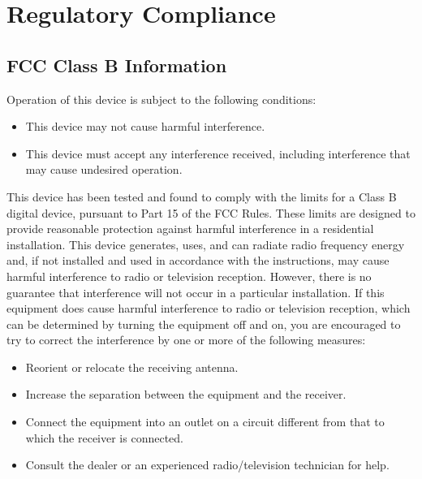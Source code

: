\documentclass[letterpaper,10pt,english]{sphinxmanual}
\begin{document}
\section{Regulatory Compliance}
\label{\detokenize{warranty:regulatory-compliance}}

\subsection{FCC Class B Information}
\label{\detokenize{warranty:fcc-class-b-information}}
Operation of this device is subject to the following conditions:
\begin{itemize}
\item {} 
This device may not cause harmful interference.

\item {} 
This device must accept any interference received, including interference that may cause undesired operation.

\end{itemize}

This device has been tested and found to comply with the limits for a Class B digital device, pursuant to Part 15 of the FCC Rules. These limits are designed to provide reasonable protection against harmful interference in a residential installation. This device generates, uses, and can radiate radio frequency energy and, if not installed and used in accordance with the instructions, may cause harmful interference to radio or television reception. However, there is no guarantee that interference will not occur in a particular installation. If this equipment does cause harmful interference to radio or television reception, which can be determined by turning the equipment off and on, you are encouraged to try to correct the interference by one or more of the following measures:
\begin{itemize}
\item {} 
Reorient or relocate the receiving antenna.

\item {} 
Increase the separation between the equipment and the receiver.

\item {} 
Connect the equipment into an outlet on a circuit different from that to which the receiver is connected.

\item {} 
Consult the dealer or an experienced radio/television technician for help.

\end{itemize}
\end{document}
